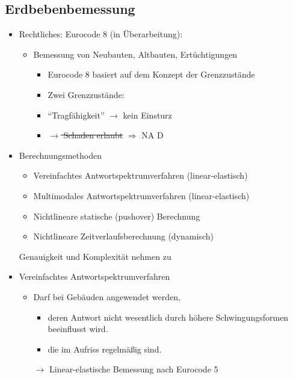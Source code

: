 \documentclass[fleqn,twoside]{article}
\begin{document}
    \subsection{Erdbebenbemessung}
        \begin{itemize}
            \item Rechtliches: Eurocode 8 (in Überarbeitung):
                \begin{itemize}
                    \item Bemessung von Neubauten, Altbauten, Ertüchtigungen
                    \begin{itemize}
                        \item Eurocode 8 basiert auf dem Konzept der Grenzzustände
                        \item Zwei Grenzzustände:
                        \item  \enquote{Tragfähigkeit} $\rightarrow$ kein Einsturz
                        \item  \sout{ $\rightarrow$ Schaden erlaubt} $\Rightarrow$ NA D
                    \end{itemize}
                \end{itemize}
            \item Berechnungsmethoden
                \begin{itemize}
                    \item Vereinfachtes Antwortspektrumverfahren (linear-elastisch)
                    \item Multimodales Antwortspektrumverfahren (linear-elastisch)
                    \item Nichtlineare statische (pushover) Berechnung
                    \item Nichtlineare Zeitverlaufsberechnung (dynamisch)
                \end{itemize}
                Genauigkeit und Komplexität nehmen zu

            \item Vereinfachtes Antwortspektrumverfahren
                \begin{itemize}
                    \item Darf bei Gebäuden angewendet werden,
                        \begin{itemize}
                            \item deren Antwort nicht wesentlich durch höhere Schwingungsformen beeinflusst wird.
                            \item die im Aufriss regelmäßig sind.
                        \end{itemize}
                        $\rightarrow$ Linear-elastische Bemessung nach Eurocode 5
                \end{itemize}


\end{itemize}
\end{document}
